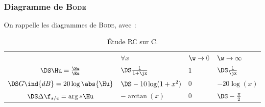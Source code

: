 \documentclass[../../main/main.tex]{subfiles}
\begin{document}
\subsubsection{Diagramme de \textsc{Bode}}
On rappelle les diagrammes de \textsc{Bode}, avec~:
\begin{table}[htbp!]
	\centering
	\caption{Étude RC sur C.}
	\begin{tabularx}{.7\linewidth}{cYYY}
		\toprule
		 &
		$\forall x$
		 &
		$\w\to 0$
		 &
		$\w\to\infty$
		\\
		\addlinespace[0.5em]
		\cmidrule(lr){2-4}
		$\DS\Hu = \frac{\Su}{\Eu}$
		 &
		$\DS \frac{1}{1+\jx}$
		 &
		$1$
		 &
		$\DS \frac{1}{\jx}$
		\\
		\addlinespace[0.5em]
		$\DS G\ind{dB} = 20 \log \abs{\Hu}$
		 &
		$\DS -10 \log (1+x^{2})$
		 &
		0
		 &
		$-20 \log (x)$
		\\
		\addlinespace[0.5em]
		$\DS\Delta\f_{s/e} = \arg*{\Hu}$
		 &
		$-\arctan(x)$
		 &
		$0$
		 &
		$\DS-\frac{\pi}{2}$
		\\
		\bottomrule
	\end{tabularx}
	\label{tab:rcc}
\end{table}
\end{document}
